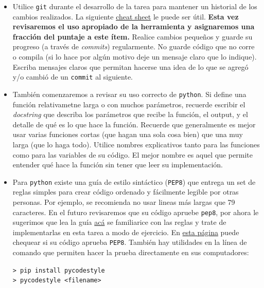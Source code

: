 \documentclass[letter, 11pt]{article}
\begin{document}
\pagebreak
{}
\begin{itemize}

  \item Utilice \texttt{git} durante el desarrollo de la tarea para mantener un
    historial de los cambios realizados. La siguiente
    \href{https://education.github.com/git-cheat-sheet-education.pdf}{cheat
      sheet} le puede ser útil. \textbf{Esta vez revisaremos el uso apropiado
    de la herramienta y asignaremos una fracción del puntaje a este ítem.}
    Realice cambios pequeños y guarde su progreso (a través de \emph{commits})
    regularmente. No guarde código que no corre o compila (si lo hace por algún
    motivo deje un mensaje claro que lo indique). Escriba mensajes claros que
    permitan hacerse una idea de lo que se agregó y/o cambió de un
    \texttt{commit} al siguiente.

  \item También comenzaremos a revisar su uso correcto de \texttt{python}. Si
    define una función relativametne larga o con muchos parámetros, recuerde
    escribir el \emph{docstring} que describa los parámetros que recibe la
    función, el output, y el detalle de qué es lo que hace la función. Recuerde
    que generalmente es mejor usar varias funciones cortas (que hagan una sola
    cosa bien) que una muy larga (que lo haga todo).  Utilice nombres
    explicativos tanto para las funciones como para las variables de su código.
    El mejor nombre es aquel que permite entender qué hace la función sin tener
    que leer su implementación.

  \item Para \texttt{python} existe una guía de estilo sintáctico
    (\texttt{PEP8}) que entrega un set de reglas simples para crear código
    ordenado y fácilmente legible por otras personas. Por ejemplo, se
    recomienda no usar lineas más largas que 79 caracteres. En el futuro
    revisaremos que su código apruebe \texttt{pep8}, por ahora le sugerimos que
    lea la guía \href{https://www.python.org/dev/peps/pep-0008/}{acá} se
    familiarice con las reglas y trate de implementarlas en esta tarea a modo
    de ejercicio. En \href{http://pep8online.com}{esta página} puede chequear
    si su código aprueba \texttt{PEP8}. También hay utilidades en la línea de
    comando que permiten hacer la prueba directamente en sus computadores: 
    
    \texttt{>\ pip install pycodestyle}\\
    \texttt{>\ pycodestyle <filename>}


\end{itemize}
\end{document}
